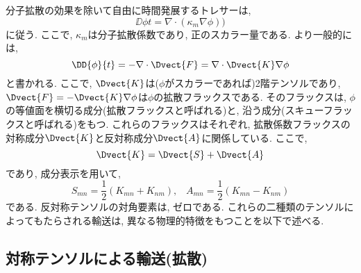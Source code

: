 分子拡散の効果を除いて自由に時間発展するトレサーは, 
\begin{equation}
  \DD{\phi}{t} = \nabla \cdot (\kappa_m \nabla \phi))
\label{eq:tracer_eq_molecular_diff}
\end{equation}
に従う. 
ここで, $\kappa_m$は分子拡散係数であり, 正のスカラー量である. 
より一般的には, 
\begin{equation}
  \DD{\phi}{t} = - \nabla \cdot \Dvect{F} = \nabla \cdot \Dvect{K} \nabla \phi
\label{eq:tracer_eq_general_diff}
\end{equation}
と書かれる. 
ここで, $\Dvect{K}$は($\phi$がスカラーであれば)2階テンソルであり, 
$\Dvect{F}=-\Dvect{K}\nabla \phi$は$\phi$の拡散フラックスである. 
そのフラックスは, $\phi$の等値面を横切る成分(拡散フラックスと呼ばれる)と, 
沿う成分(スキューフラックスと呼ばれる)をもつ. 
これらのフラックスはそれぞれ, 拡散係数フラックスの対称成分$\Dvect{K}$と反対称成分$\Dvect{A}$に関係している. 
ここで, 
\begin{equation}
  \Dvect{K} = \Dvect{S} + \Dvect{A}
\end{equation}
であり, 成分表示を用いて, 
\begin{equation}
 S_{mn} = \dfrac{1}{2} (K_{mn} + K_{nm}), \;\;\;
 A_{mn} = \dfrac{1}{2} (K_{mn} - K_{nm}) 
\end{equation}
である. 
反対称テンソルの対角要素は, ゼロである. 
これらの二種類のテンソルによってもたらされる輸送は, 異なる物理的特徴をもつことを以下で述べる. 

\subsection{対称テンソルによる輸送(拡散)}

